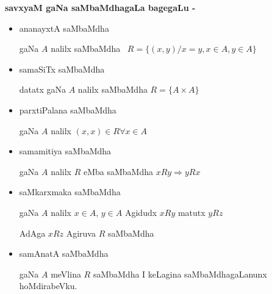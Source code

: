 \begin{center}
{\large\bf savxyaM gaNa saMbaMdhagaLa bagegaLu - }
\end{center}

\begin{itemize}
\item[\eng{(1)}] ananayxtA saMbaMdha \ 

gaNa $A$ nalilx saMbaMdha \ $R=\{(x,y)/x=y, x\in A, y\in A\}$

\item[\eng{(2)}] samaSiTx saMbaMdha \ 

datatx gaNa $A$ nalilx saMbaMdha $R=\{A\times A\}$

\item[\eng{(3)}] parxtiPalana saMbaMdha \ 

gaNa $A$ nalilx $(x,x)\in R\forall x\in A$

\item[\eng{(4)}] samamitiya saMbaMdha \ 

gaNa $A$ nalilx $R$ eMba saMbaMdha $xRy\Rightarrow yRx$

\item[\eng{(5)}] saMkarxmaka saMbaMdha \ 

gaNa $A$ nalilx $x\in A$, $y\in A$ Agidudx $xRy$ matutx $yRz$

AdAga $xRz$ Agiruva $R$ saMbaMdha

\item[\eng{(6)}] samAnatA saMbaMdha \ 

gaNa $A$ meVlina $R$ saMbaMdha I keLagina saMbaMdhagaLanunx hoMdirabeVku.
\end{itemize}


